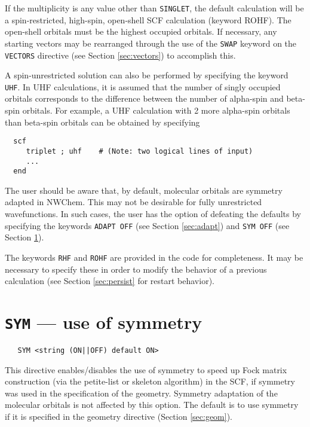 If the multiplicity is any value other than \verb+SINGLET+, the
default calculation will be a spin-restricted, high-spin, open-shell
SCF calculation (keyword ROHF).  The open-shell orbitals must be the
highest occupied orbitals.  If necessary, any starting vectors may be
rearranged through the use of the \verb+SWAP+ keyword on the
\verb+VECTORS+ directive (see Section \ref{sec:vectors}) to accomplish
this.

A spin-unrestricted solution can also be performed by specifying the
keyword \verb+UHF+.  In UHF calculations, it is assumed that the
number of singly occupied orbitals corresponds to the difference
between the number of alpha-spin and beta-spin orbitals.  For example,
a UHF calculation with 2 more alpha-spin orbitals than beta-spin
orbitals can be obtained by specifying

\begin{verbatim}
  scf
     triplet ; uhf    # (Note: two logical lines of input)
     ...
  end
\end{verbatim}

The user should be aware that, by default, molecular orbitals are
symmetry adapted in NWChem.  This may not be desirable for fully
unrestricted wavefunctions.  In such cases, the user has the option of
defeating the defaults by specifying the keywords \verb+ADAPT OFF+
(see Section \ref{sec:adapt}) and \verb+SYM OFF+ (see Section
\ref{sec:sym}).

The keywords \verb+RHF+ and \verb+ROHF+ are provided in the code for
completeness. It may be necessary to specify these in order to modify
the behavior of a previous calculation (see Section \ref{sec:persist}
for restart behavior).

\section{{\tt SYM} --- use of symmetry}
\label{sec:sym}

 \begin{verbatim}
   SYM <string (ON||OFF) default ON>
 \end{verbatim}

This directive enables/disables the use of symmetry to speed up Fock matrix
construction (via the petite-list or skeleton algorithm) in the SCF, if
symmetry was used in the specification of the geometry.  Symmetry
adaptation of the molecular orbitals is not affected by this option.
The default is to use symmetry if it is specified in the geometry
directive (Section \ref{sec:geom}). 

